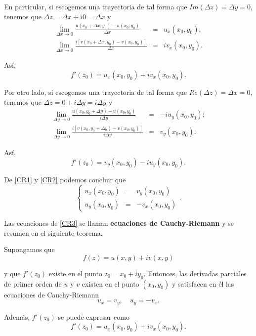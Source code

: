 En particular, si escogemos una trayectoria de tal forma que $Im(\Delta z) = \Delta y = 0$, tenemos que $\Delta z= \Delta x + i0 = \Delta x$ y 
\begin{eqnarray*}
\lim_{\Delta x \to 0} \frac{u(x_0 + \Delta x, y_0) -u(x_0,y_0)}{\Delta x} &=& u_x(x_0,y_0) ; \\
\lim_{\Delta x \to 0} \frac{i[v(x_0 + \Delta x, y_0) -v(x_0,y_0)]}{\Delta x} &=& i v_x(x_0,y_0) .
\end{eqnarray*}

Así,
\begin{equation}
f'(z_0) = u_x(x_0,y_0) + i v_x(x_0,y_0). \label{CR1}
\end{equation}

Por otro lado, si escogemos una trayectoria de tal forma que $Re(\Delta z) = \Delta x = 0$, tenemos que $\Delta z = 0 + i \Delta y = i \Delta y$ y 
\begin{eqnarray*}
\lim_{\Delta y \to 0} \frac{u(x_0, y_0 + \Delta y) -u(x_0,y_0)}{i \Delta y} &=& - iu_y(x_0,y_0) ;  \\
\lim_{\Delta y \to 0} \frac{i[v(x_0, y_0 + \Delta y) -v(x_0,y_0)]}{i \Delta y} &=&  v_y(x_0,y_0) .
\end{eqnarray*}

Así,
\begin{equation}
f'(z_0) = v_y(x_0,y_0) - i u_y(x_0,y_0). \label{CR2}
\end{equation}

De \eqref{CR1} y \eqref{CR2} podemos concluir que
\begin{equation}
\left\{ \begin{array}{ccc}
u_x(x_0,y_0)& =& v_y(x_0,y_0) \\
u_y(x_0,y_0) &=& - v_x(x_0,y_0)
\end{array} \right. . \label{CR3}
\end{equation}

Las ecuaciones de \eqref{CR3} se llaman \textbf{ecuaciones de Cauchy-Riemann} y se resumen en el siguiente teorema.

\begin{teorema}
Supongamos que 
$$f(z) = u(x,y) + i v(x,y)$$

y que $f'(z_0)$ existe en el punto $z_0 = x_0 + iy_0$. Entonces, las derivadas parciales de primer orden de $u$ y $v$ existen en el punto $(x_0,y_0)$ y satisfacen en él las ecuaciones de Cauchy-Riemann
$$ u_x = v_y, \quad u_y = -v_x. $$

Además, $f'(z_0)$ se puede expresar como
$$f'(z_0) = u_x(x_0,y_0) + i v_x(x_0,y_0).$$
\end{teorema}

